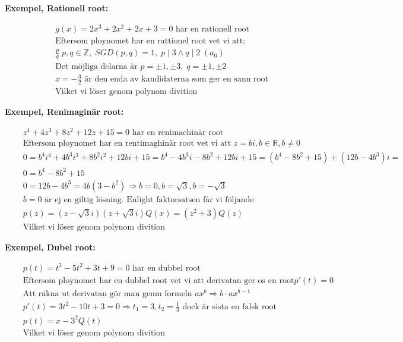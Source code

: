 \documentclass{article}
\begin{document}
\newpage
\textbf{Exempel, Rationell root:}\par
\begin{align*}
  &\quad  g(x)= 2x^3 +2x^2 +2x +3 = 0 \text{ har en rationell root} \\
  &\quad  \text{Eftersom ploynomet har en rattionel root vet vi att: } \\
  &\quad  \frac{p}{q} \; p,q \in \mathbb{Z}, \; SGD(p,q) = 1, \; p \mid 3 \land q \mid 2 \; (a_0) \\
  &\quad  \text{Det möjliga delarna är } p=\pm 1,\pm 3, \; q=\pm 1,\pm 2 \\
  &\quad  x=-\frac{3}{2} \text{ är den enda av kandidaterna som ger en sann root} \\
  &\quad  \text{Vilket vi löser genom polynom divition}
\end{align*}


\textbf{Exempel, Renimaginär root:}\par
\begin{align*}
  &\quad  z^4 + 4z^3 + 8z^2 + 12z +15 = 0 \text{ har en renimachinär root} \\
  &\quad  \text{Eftersom ploynomet har en rentimaghinär root vet vi att } z=bi, b \in \mathbb{R}, b \neq 0 \\
  &\quad  0= b^4i^4 +4b^3i^3 +8b^2i^2 +12bi +15 = b^4 -4b^3i -8b^2 +12bi +15 = (b^4-8b^2+15) + (12b-4b^3)i = \\
  &\quad  0= b^4-8b^2+15 \\
  &\quad  0= 12b-4b^3 = 4b(3-b^2) \Rightarrow b=0, b=\sqrt{3}, b=-\sqrt{3} \\
  &\quad  b=0 \text{ är ej en giltig lösning. Enlight faktorsatsen får vi följande} \\
  &\quad  p(z)=(z-\sqrt{3}i)(z+\sqrt{3}i)Q(x) = (z^2+3)Q(z) \\
  &\quad  \text{Vilket vi löser genom polynom divition}
\end{align*}

\textbf{Exempel, Dubel root:}\par
\begin{align*}
  &\quad  p(t)= t^3 -5t^2 +3t +9 = 0 \text{ har en dubbel root} \\
  &\quad  \text{Eftersom ploynomet har en dubbel root vet vi att derivatan ger os en root} p'(t)=0  \\
  &\quad  \text{Att räkna ut derivatan gör man genm formeln } ax^b \Rightarrow b\cdot ax^{b-1} \\
  &\quad  p'(t) = 3t^2 -10t +3 = 0 \Rightarrow t_1=3,t_2=\frac{1}{3} \text{ dock är sista en falsk root} \\
  &\quad  p(t) = {x-3}^2Q(t) \\ 
  &\quad  \text{Vilket vi löser genom polynom divition}
\end{align*}
\end{document}
